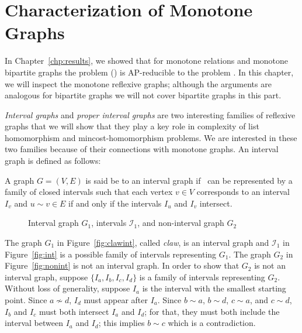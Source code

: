 \chapter{Characterization of Monotone Graphs}
In Chapter~\ref{chp:results}, we showed that for monotone relations and monotone
bipartite graphs the problem \ccsp(\mH) is AP-reducible to the problem \cbis\@. In this chapter,
we will inspect the monotone reflexive graphs; although the arguments are
analogous for bipartite graphs we will not cover bipartite graphs in this part.

\emph{Interval graphs} and \emph{proper interval graphs}
are two interesting families of reflexive graphs that we will show that they play a key role in complexity of 
list homomorphism and mincost-homomorphism problems. We are interested in these two families
because of their connections with monotone graphs. An interval graph is defined as follows:

\begin{defi}
A graph \(G=(V,E)\) is said be to an interval graph if \mG\ can
be represented by a family of closed intervals such that
each vertex \(v \in V\) corresponds to an interval \(I_v\) and \(u \sim v \in E\)
if and only if the intervals \(I_u\) and \(I_v\) intersect.
\end{defi}

\begin{figure} [h]
\hspace{1cm}
\subfigure[\ensuremath{G_1}]{\label{fig:clawint}} \hspace{2cm}
\subfigure[\ensuremath{I_1}]{\label{fig:int}}\hspace{2cm}
\subfigure[\ensuremath{G_2}]{\label{fig:nonint}}
\caption{Interval graph \ensuremath{G_1}, intervals \ensuremath{\mathcal{I}_1}, and non-interval graph \ensuremath{G_2}}
\end{figure}

The graph \(G_1\) in Figure~\ref{fig:clawint}, called \emph{claw}, is an interval graph
and \(\mathcal{I}_1\) in Figure~\ref{fig:int} is a possible family of intervals representing \(G_1\)\@.
The graph \(G_2\) in Figure~\ref{fig:nonint} is not an interval graph. In order to show that \(G_2\) is not
an interval graph, suppose \(\{I_a, I_b, I_c, I_d\}\) is a family of intervals representing \(G_2\)\@.
Without loss of generality, suppose \(I_a\) is the interval with the smallest starting point.
Since \(a\not \sim d\), \(I_d\) must appear after \(I_a\)\@. Since \(b\sim a\), \(b\sim d\), \(c\sim a\), and \(c\sim d\),
\(I_b\) and \(I_c\) must both intersect \(I_a\) and \(I_d\); for that, they must both include the interval between
\(I_a\) and \(I_d\); this implies \(b\sim c\) which is a contradiction.

